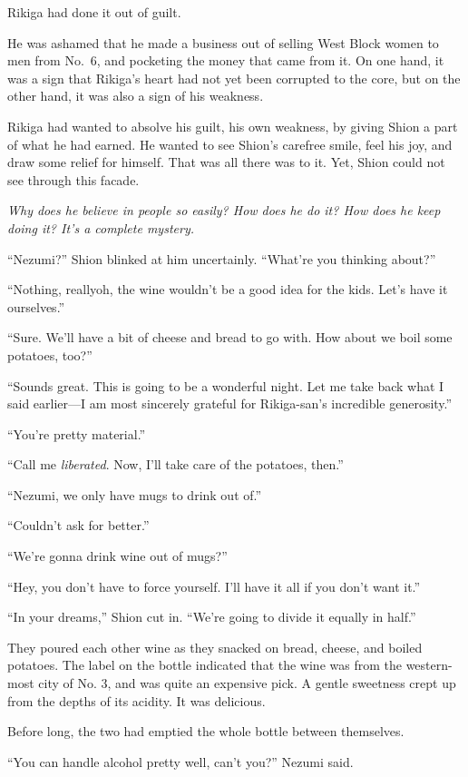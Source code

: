 Rikiga had done it out of guilt.

He was ashamed that he made a business out of selling West Block women
to men from No.~6, and pocketing the money that came from it. On one
hand, it was a sign that Rikiga's heart had not yet been corrupted to
the core, but on the other hand, it was also a sign of his weakness.

Rikiga had wanted to absolve his guilt, his own weakness, by giving
Shion a part of what he had earned. He wanted to see Shion's carefree
smile, feel his joy, and draw some relief for himself. That was all
there was to it. Yet, Shion could not see through this facade.

\emph{Why does he believe in people so easily? How does he do it?
How does he keep doing it? It's a complete mystery.}

``Nezumi?'' Shion blinked at him uncertainly. ``What're you thinking
about?''

``Nothing, really\el oh, the wine wouldn't be a good idea for the kids.
Let's have it ourselves.''

``Sure. We'll have a bit of cheese and bread to go with. How about we
boil some potatoes, too?''

``Sounds great. This is going to be a wonderful night. Let me take back
what I said earlier---I am most sincerely grateful for Rikiga-san's
incredible generosity.''

``You're pretty material.''

``Call me \emph{liberated}. Now, I'll take care of the potatoes, then.''

``Nezumi, we only have mugs to drink out of.''

``Couldn't ask for better.''

``We're gonna drink wine out of mugs?''

``Hey, you don't have to force yourself. I'll have it all if you don't
want it.''

``In your dreams,'' Shion cut in. ``We're going to divide it equally in
half.''

They poured each other wine as they snacked on bread, cheese, and boiled
potatoes. The label on the bottle indicated that the wine was from the
western-most city of No. 3, and was quite an expensive pick. A gentle
sweetness crept up from the depths of its acidity. It was delicious.

Before long, the two had emptied the whole bottle between themselves.

``You can handle alcohol pretty well, can't you?'' Nezumi said.

